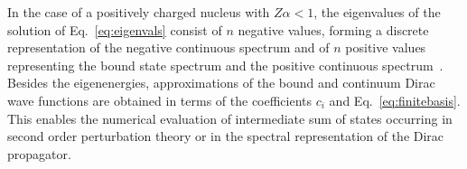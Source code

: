 In the case of a positively charged nucleus with $Z\alpha<1$, the eigenvalues of the solution of Eq.~\eqref{eq:eigenvals} consist of $n$ negative values, forming a discrete representation of the negative continuous spectrum and of $n$ positive values representing the bound state spectrum and the positive continuous spectrum~\cite{drake1981}. Besides the eigenenergies, approximations of the bound and continuum Dirac wave functions are obtained in terms of the coefficients $c_i$ and Eq.~\eqref{eq:finitebasis}. This enables the numerical evaluation of intermediate sum of states occurring in second order perturbation theory or in the spectral representation of the Dirac propagator.





